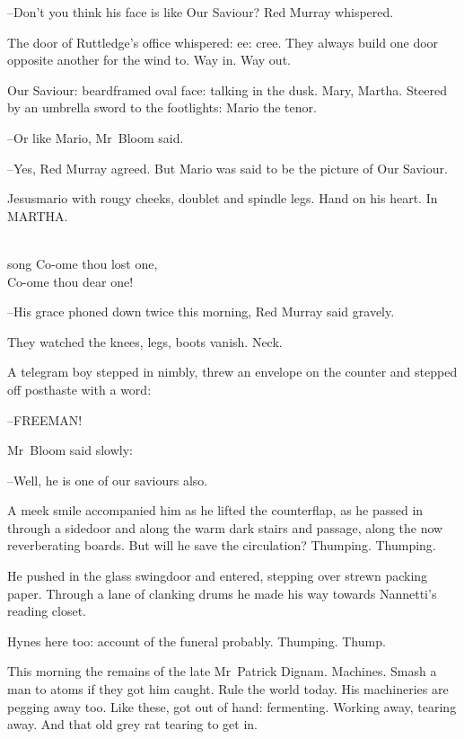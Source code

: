 --Don't you think his face is like Our Saviour?
Red Murray whispered.

The door of Ruttledge's office whispered: ee: cree.
They always build one door opposite another for the wind to.
Way in.
Way out.

Our Saviour:
beardframed oval face:
talking in the dusk.
Mary, Martha.
Steered by an umbrella sword to the footlights:
Mario the tenor.

--Or like Mario,
Mr~Bloom said.

--Yes,
Red Murray agreed.
But Mario was said to be the picture of Our Saviour.

Jesusmario with rougy cheeks, doublet and spindle legs.
Hand on his heart.
In MARTHA.


\\song{%
    Co-ome thou lost one,\\
    Co-ome thou dear one!}



--His grace phoned down twice this morning,
Red Murray said gravely.

They watched the knees, legs, boots vanish.
Neck.

A telegram boy stepped in nimbly,
threw an envelope on the counter
and stepped off posthaste with a word:

--FREEMAN!

Mr~Bloom said slowly:

--Well, he is one of our saviours also.

A meek smile accompanied him
as he lifted the counterflap,
as he passed in through a sidedoor
and along the warm dark stairs and passage,
along the now reverberating boards.
But will he save the circulation?
Thumping.
Thumping.

He pushed in the glass swingdoor and entered,
stepping over strewn packing paper.
Through a lane of clanking drums
he made his way towards Nannetti's reading closet.

Hynes here too:
account of the funeral probably.
Thumping.
Thump.



This morning the remains of the late Mr~Patrick Dignam.
Machines.
Smash a man to atoms if they got him caught.
Rule the world today.
His machineries are pegging away too.
Like these, got out of hand:
fermenting.
Working away, tearing away.
And that old grey rat tearing to get in.


